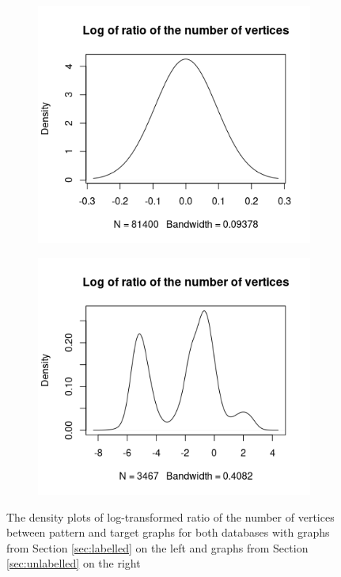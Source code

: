\documentclass{l4proj}
\theoremstyle{definition}
\theoremstyle{remark}
\begin{document}
\begin{figure}
  \centering
  \begin{subfigure}[t]{0.49\textwidth}
    \centering
    \includegraphics[width=\textwidth]{images/mcs_ratio_vertices.png}
  \end{subfigure}
  \begin{subfigure}[t]{0.49\textwidth}
    \centering
    \includegraphics[width=\textwidth]{images/sip_ratio_vertices.png}
  \end{subfigure}
  \caption{The density plots of log-transformed ratio of the number of vertices
    between pattern and target graphs for both databases with graphs from
    Section \ref{sec:labelled} on the left and graphs from Section
    \ref{sec:unlabelled} on the right}
  \label{fig:ratio_vertices}
\end{figure}
\end{document}
